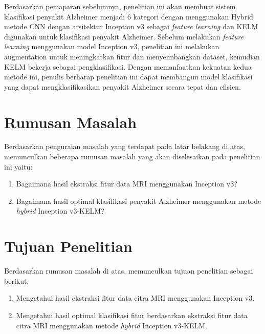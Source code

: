     Berdasarkan pemaparan sebelumnya, penelitian ini akan membuat sistem klasifikasi penyakit Alzheimer menjadi 6 kategori dengan menggunakan Hybrid metode CNN dengan arsitektur Inception v3 sebagai \textit{feature learning} dan KELM digunakan untuk klasifikasi penyakit Alzheimer. Sebelum melakukan \textit{feature learning} menggunakan model Inception v3, penelitian ini melakukan augmentation untuk meningkatkan fitur dan menyeimbangkan dataset, kemudian KELM bekerja sebagai pengklasifikasi. Dengan memanfaatkan kekuatan kedua metode ini, penulis berharap penelitian ini dapat membangun model klasifikasi yang dapat mengklasifikasikan penyakit Alzheimer secara tepat dan efisien.

    \section{Rumusan Masalah}
    Berdasarkan penguraian masalah yang terdapat pada latar belakang di atas, memunculkan beberapa rumusan masalah yang akan diselesaikan pada penelitian ini yaitu:
    \begin{enumerate}
        \item Bagaimana hasil ekstraksi fitur data MRI menggunakan Inception v3?
        \item Bagaimana hasil optimal klasifikasi penyakit Alzheimer menggunakan metode \textit{hybrid} Inception v3-KELM?
    \end{enumerate}

    \section{Tujuan Penelitian}
    Berdasarkan rumusan masalah di atas, memunculkan tujuan penelitian sebagai berikut:
    \begin{enumerate}
        \item Mengetahui hasil ekstraksi fitur data citra MRI menggunakan Inception v3.
        \item Mengetahui hasil optimal klasifikasi fitur berdasarkan ekstraksi fitur data citra MRI menggunakan metode \textit{hybrid} Inception v3-KELM.
    \end{enumerate}

